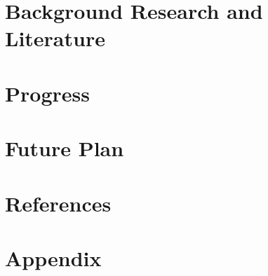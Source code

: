 \documentclass[12pt,twoside,a4paper]{report}
\begin{document}
    \chapter{Background Research and Literature}
    \lipsum[1-5]
    
    \chapter{Progress}
    \lipsum[1-5]
    
    \chapter{Future Plan}
    \lipsum[1-5]
    
    \chapter*{References}
    
    \chapter*{Appendix}
     
\end{document}
